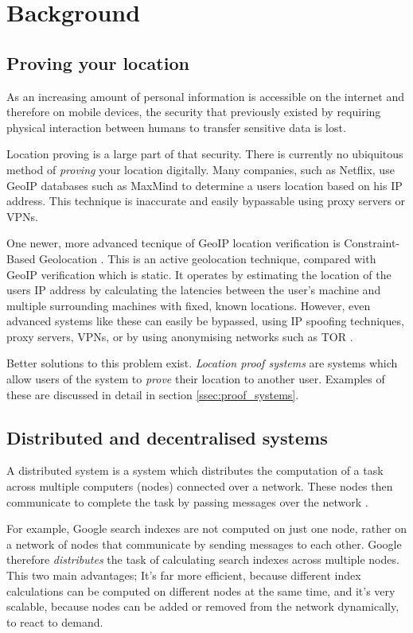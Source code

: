 \section{Background}
\subsection{Proving your location}
As an increasing amount of personal information is accessible on the internet and therefore on mobile devices, the security that previously existed by requiring physical interaction between humans to transfer sensitive data is lost.

Location proving is a large part of that security. There is currently no ubiquitous method of \textit{proving} your location digitally. Many companies, such as Netflix, use GeoIP databases such as MaxMind \cite{maxmind} to determine a users location based on his IP address. This technique is inaccurate and easily bypassable using proxy servers or VPNs.

One newer, more advanced tecnique of GeoIP location verification is Constraint-Based Geolocation \cite{constraint-based}. This is an active geolocation technique, compared with GeoIP verification which is static. It operates by estimating the location of the users IP address by calculating the latencies between the user's machine and multiple surrounding machines with fixed, known locations. However, even advanced systems like these can easily be bypassed, using IP spoofing techniques, proxy servers, VPNs, or by using anonymising networks such as TOR \cite{tor}.

Better solutions to this problem exist. \textit{Location proof systems} are systems which allow users of the system to \textit{prove} their location to another user. Examples of these are discussed in detail in section \ref{ssec:proof_systems}.

\subsection{Distributed and decentralised systems}
A distributed system is a system which distributes the computation of a task across multiple computers (nodes) connected over a network. These nodes then communicate to complete the task by passing messages over the network \cite{distributed}.

For example, Google search indexes are not computed on just one node, rather on a network of nodes that communicate by sending messages to each other. Google therefore \textit{distributes} the task of calculating search indexes across multiple nodes. This two main advantages; It's far more efficient, because different index calculations can be computed on different nodes at the same time, and it's very scalable, because nodes can be added or removed from the network dynamically, to react to demand.


